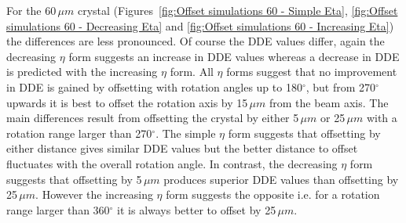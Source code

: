For the 60$\,\mu m$ crystal (Figures~\ref{fig:Offset simulations 60 - Simple Eta}, \ref{fig:Offset simulations 60 - Decreasing Eta} and \ref{fig:Offset simulations 60 - Increasing Eta}) the differences are less pronounced.
Of course the DDE values differ, again the decreasing $\eta$ form suggests an increase in DDE values whereas a decrease in DDE is predicted with the increasing $\eta$ form.
All $\eta$ forms suggest that no improvement in DDE is gained by offsetting with rotation angles up to 180$^{\circ}$, but from 270$^{\circ}$ upwards it is best to offset the rotation axis by 15$\,\mu m$ from the beam axis.
The main differences result from offsetting the crystal by either 5$\,\mu m$ or 25$\,\mu m$ with a rotation range larger than 270$^{\circ}$.
The simple $\eta$ form suggests that offsetting by either distance gives similar DDE values but the better distance to offset fluctuates with the overall rotation angle.
In contrast, the decreasing $\eta$ form suggests that offsetting by 5$\,\mu m$ produces superior DDE values than offsetting by 25$\,\mu m$.
However the increasing $\eta$ form suggests the opposite i.e. for a rotation range larger than 360$^{\circ}$ it is always better to offset by 25$\,\mu m$.
